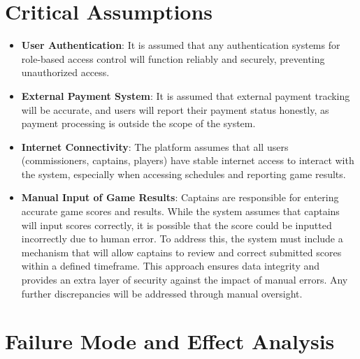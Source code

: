 \documentclass{article}
\begin{document}
\section{Critical Assumptions}

\begin{itemize}
    \item \textbf{User Authentication}: It is assumed that any authentication systems for role-based access control will function reliably and securely, preventing unauthorized access.
    \item \textbf{External Payment System}: It is assumed that external payment tracking will be accurate, and users will report their payment status honestly, as payment processing is outside the scope of the system.
    \item \textbf{Internet Connectivity}: The platform assumes that all users (commissioners, captains, players) have stable internet access to interact with the system, especially when accessing schedules and reporting game results.
    \item \textbf{Manual Input of Game Results}: Captains are responsible for entering accurate game scores and results.
          While the system assumes that captains will input scores correctly, it is possible that the score could be inputted incorrectly due to human error. To address this, the system must include a mechanism that will allow captains to review and correct submitted scores within a defined timeframe. This approach ensures data integrity and provides an extra layer of security against the impact of manual errors. Any further discrepancies will be addressed through manual oversight.
\end{itemize}

\section{Failure Mode and Effect Analysis}
\end{document}
